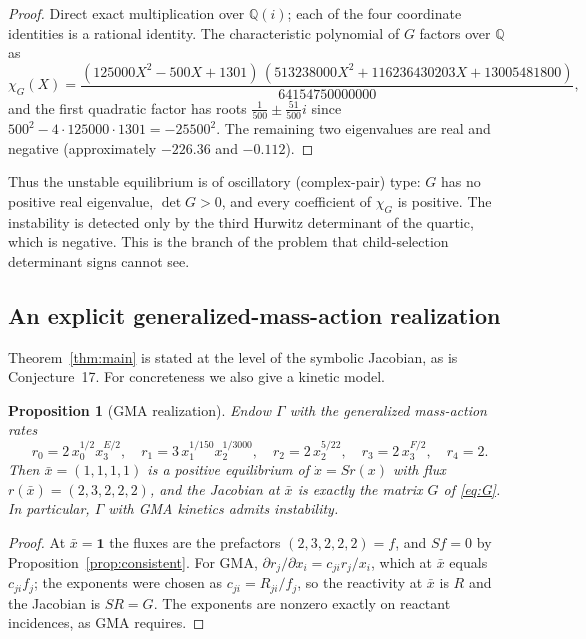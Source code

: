 \documentclass[11pt,a4paper]{article}
\newtheorem{proposition}[theorem]{Proposition}
\theoremstyle{definition}
\theoremstyle{remark}
\newcommand{\Q}{\mathbb{Q}}
\newcommand{\Ecst}{E}
\newcommand{\Fcst}{F}
\begin{document}
\begin{proof}
Direct exact multiplication over $\Q(i)$; each of the four coordinate identities is a rational identity. The characteristic polynomial of $G$ factors over $\Q$ as
\[
\chi_G(X)=\frac{(125000X^2-500X+1301)\,(513238000X^2+116236430203X+13005481800)}{64154750000000},
\]
and the first quadratic factor has roots $\tfrac{1}{500}\pm\tfrac{51}{500}i$ since $500^2-4\cdot125000\cdot1301=-25500^2$. The remaining two eigenvalues are real and negative (approximately $-226.36$ and $-0.112$).
\end{proof}

Thus the unstable equilibrium is of oscillatory (complex-pair) type: $G$ has no positive real eigenvalue, $\det G>0$, and every coefficient of $\chi_G$ is positive. The instability is detected only by the third Hurwitz determinant of the quartic, which is negative. This is the branch of the problem that child-selection determinant signs cannot see.

\subsection{An explicit generalized-mass-action realization}

Theorem~\ref{thm:main} is stated at the level of the symbolic Jacobian, as is Conjecture~17. For concreteness we also give a kinetic model.

\begin{proposition}[GMA realization]\label{prop:gma}
Endow $\Gamma$ with the generalized mass-action rates
\[
r_0=2\,x_0^{1/2}x_3^{\Ecst/2},\quad
r_1=3\,x_1^{1/150}x_2^{1/3000},\quad
r_2=2\,x_2^{5/22},\quad
r_3=2\,x_3^{\Fcst/2},\quad
r_4=2 .
\]
Then $\bar x=(1,1,1,1)$ is a positive equilibrium of $\dot x=Sr(x)$ with flux $r(\bar x)=(2,3,2,2,2)$, and the Jacobian at $\bar x$ is exactly the matrix $G$ of \eqref{eq:G}. In particular, $\Gamma$ with GMA kinetics admits instability.
\end{proposition}

\begin{proof}
At $\bar x=\mathbf 1$ the fluxes are the prefactors $(2,3,2,2,2)=f$, and $Sf=0$ by Proposition~\ref{prop:consistent}. For GMA, $\partial r_j/\partial x_i=c_{ji}r_j/x_i$, which at $\bar x$ equals $c_{ji}f_j$; the exponents were chosen as $c_{ji}=R_{ji}/f_j$, so the reactivity at $\bar x$ is $R$ and the Jacobian is $SR=G$. The exponents are nonzero exactly on reactant incidences, as GMA requires.
\end{proof}
\end{document}
